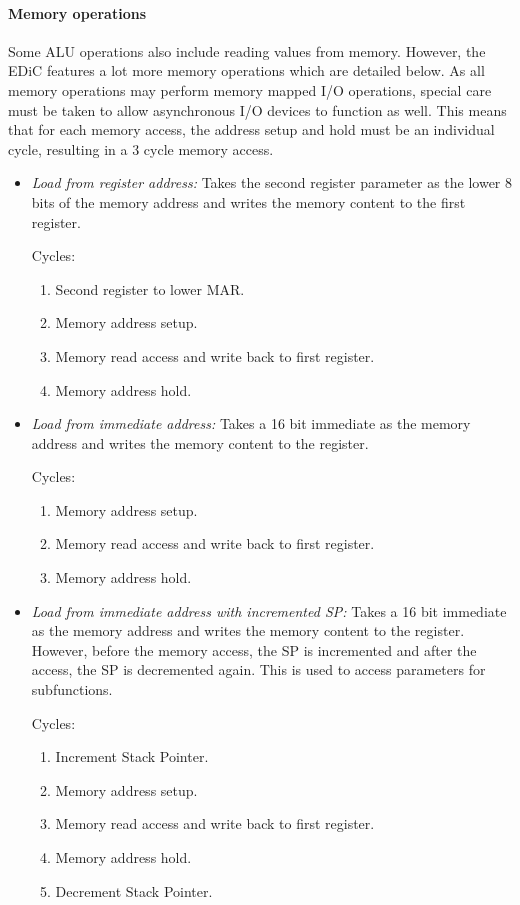 \paragraph{Memory operations} Some \gls{ALU} operations also include reading values from memory.
However, the \gls{EDiC} features a lot more memory operations which are detailed below.
As all memory operations may perform memory mapped I/O operations, special care must be taken to allow asynchronous I/O devices to function as well.
This means that for each memory access, the address setup and hold must be an individual cycle, resulting in a 3 cycle memory access.
\begin{itemize}
  \item \emph{Load from register address:} Takes the second register parameter as the lower 8 bits of the memory address and writes the memory content to the first register.

  Cycles:
  \begin{enumerate}
    \item Second register to lower \gls{MAR}.
    \item Memory address setup.
    \item Memory read access and write back to first register.
    \item Memory address hold.
  \end{enumerate}

  \item \emph{Load from immediate address:} Takes a 16 bit immediate as the memory address and writes the memory content to the register.

  Cycles:
  \begin{enumerate}
    \item Memory address setup.
    \item Memory read access and write back to first register.
    \item Memory address hold.
  \end{enumerate}

  \item \emph{Load from immediate address with incremented \gls{SP}:} Takes a 16 bit immediate as the memory address and writes the memory content to the register.
  However, before the memory access, the \gls{SP} is incremented and after the access, the \gls{SP} is decremented again.
  This is used to access parameters for subfunctions.

  Cycles:
  \begin{enumerate}
    \item Increment Stack Pointer.
    \item Memory address setup.
    \item Memory read access and write back to first register.
    \item Memory address hold.
    \item Decrement Stack Pointer.
  \end{enumerate}


\end{itemize}
